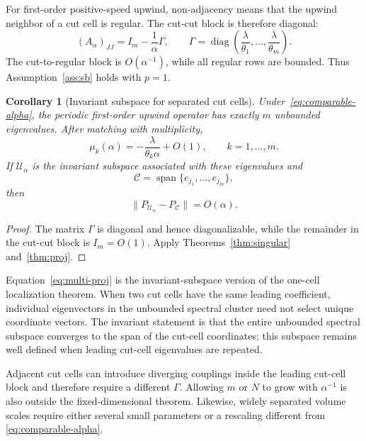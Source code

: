 \documentclass[preprint,12pt]{elsarticle}
\newtheorem{corollary}[theorem]{Corollary}
\begin{document}
For first-order positive-speed upwind, non-adjacency means that the upwind
neighbor of a cut cell is regular.  The cut-cut block is therefore diagonal:
\[
    (A_\alpha)_{JJ}
    =
    I_m-\frac1\alpha\Gamma,
    \qquad
    \Gamma=
    \operatorname{diag}\!\left(
        \frac{\lambda}{\theta_1},\ldots,
        \frac{\lambda}{\theta_m}
    \right).
\]
The cut-to-regular block is $O(\alpha^{-1})$, while all regular rows are
bounded.  Thus Assumption~\ref{ass:sb} holds with $p=1$.

\begin{corollary}[Invariant subspace for separated cut cells]
\label{thm:multi}
Under~\eqref{eq:comparable-alpha}, the periodic first-order upwind operator has
exactly $m$ unbounded eigenvalues.  After matching with multiplicity,
\begin{equation}
    \mu_k(\alpha)
    =
    -\frac{\lambda}{\theta_k\alpha}+O(1),
    \qquad k=1,\ldots,m.
    \label{eq:multi-eigs}
\end{equation}
If $\mathcal U_\alpha$ is the invariant subspace associated with these eigenvalues
and
\[
    \mathcal C=\operatorname{span}\{e_{j_1},\ldots,e_{j_m}\},
\]
then
\begin{equation}
    \|P_{\mathcal U_\alpha}-P_\mathcal C\|=O(\alpha).
    \label{eq:multi-proj}
\end{equation}
\end{corollary}

\begin{proof}
The matrix $\Gamma$ is diagonal and hence diagonalizable, while the remainder in
the cut-cut block is $I_m=O(1)$.  Apply
Theorems~\ref{thm:singular} and~\ref{thm:proj}.
\end{proof}

Equation~\eqref{eq:multi-proj} is the invariant-subspace version of the
one-cell localization theorem.  When two cut cells have the same leading
coefficient, individual eigenvectors in the unbounded spectral cluster need
not select unique coordinate vectors.  The invariant statement is that the
entire unbounded spectral subspace converges to the span of the cut-cell
coordinates; this subspace remains well defined when leading cut-cell
eigenvalues are repeated.

Adjacent cut cells can introduce
diverging couplings inside the leading cut-cell block and therefore require a different
$\Gamma$.  Allowing $m$ or $N$ to grow with $\alpha^{-1}$ is also outside the
fixed-dimensional theorem.  Likewise, widely separated volume scales require
either several small parameters or a rescaling different from
\eqref{eq:comparable-alpha}.
\end{document}
